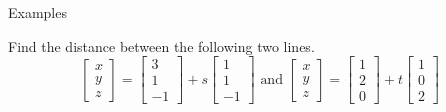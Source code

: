 \documentclass{beamer}
\begin{document}
\begin{frame}{Examples}
\begin{example}
Find the distance between the following two lines.
\begin{equation*}
\left[
\begin{array}{c}
x\\
y\\
z
\end{array}
\right] = \left[
\begin{array}{c}
3\\
1\\
-1
\end{array}
\right]+s \left[
\begin{array}{c}
1\\
1\\
-1
\end{array}
\right]\text{ and } \left[
\begin{array}{c}
x\\
y\\
z
\end{array}
\right] = \left[
\begin{array}{c}
1\\
2\\
0
\end{array}
\right] +t \left[
\begin{array}{c}
1\\
0\\
2
\end{array}
\right]
\end{equation*}
\end{example}
\end{frame}
\end{document}

